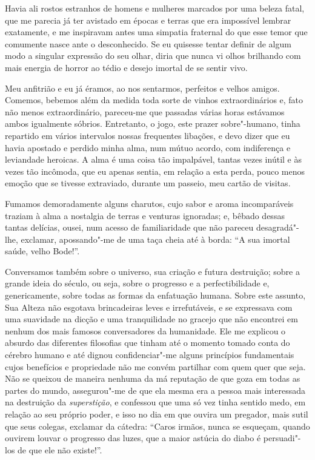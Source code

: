Havia ali rostos estranhos de homens e mulheres marcados por uma beleza
fatal, que me parecia já ter avistado em épocas e terras que era
impossível lembrar exatamente, e me inspiravam antes uma simpatia
fraternal do que esse temor que comumente nasce ante o
desconhecido. Se eu quisesse tentar definir de algum modo a
singular expressão do seu olhar, diria que nunca vi olhos
brilhando com mais energia de horror ao tédio e desejo imortal de
se sentir vivo.

Meu anfitrião e eu já éramos, ao nos sentarmos, perfeitos e velhos 
amigos. Comemos, bebemos além da medida toda sorte de vinhos
extraordinários e, fato não menos extraordinário, pareceu-me que passadas várias horas estávamos ambos igualmente sóbrios. Entretanto,
o jogo, este prazer sobre"-humano, tinha repartido em vários
intervalos nossas frequentes libações, e devo dizer que eu havia
apostado e perdido minha alma, num mútuo acordo, com indiferença e
leviandade heroicas. A alma é uma coisa tão impalpável, tantas vezes
inútil e às vezes tão incômoda, que eu apenas sentia, em relação a esta
perda, pouco menos emoção que se tivesse extraviado, durante um
passeio, meu cartão de visitas.

Fumamos demoradamente alguns charutos, cujo sabor e aroma incomparáveis
traziam à alma a nostalgia de terras e venturas ignoradas; e,
bêbado dessas tantas delícias, ousei, num acesso de familiaridade que
não pareceu desagradá"-lhe, exclamar, apossando"-me de uma taça cheia
até à borda: “A sua imortal saúde, velho
Bode!''.

Conversamos também sobre o universo, sua criação e futura destruição;
sobre a grande ideia do século, ou seja, sobre o progresso e a
perfectibilidade e, genericamente, sobre todas as formas da enfatuação
humana. Sobre este assunto, Sua Alteza não esgotava brincadeiras leves
e irrefutáveis, e se expressava com uma suavidade na dicção e uma
tranquilidade no gracejo que não encontrei em nenhum dos mais famosos
conversadores da humanidade. Ele me explicou o absurdo das diferentes
filosofias que tinham até o momento tomado conta do cérebro humano e
até dignou confidenciar"-me alguns princípios fundamentais cujos
benefícios e propriedade não me convém partilhar com quem quer que seja.
Não se queixou de maneira nenhuma da má reputação de que goza em todas
as partes do mundo, assegurou"-me de que ela mesma era a pessoa mais
interessada na destruição da \textit{superstição}, e confessou que uma só vez
tinha sentido medo, em relação ao seu próprio poder, e isso no dia em
que ouvira um pregador, mais sutil que seus colegas, exclamar da
cátedra: “Caros irmãos, nunca se esqueçam, quando
ouvirem louvar o progresso das luzes, que a maior astúcia do diabo é
persuadi"-los de que ele não existe!''.

